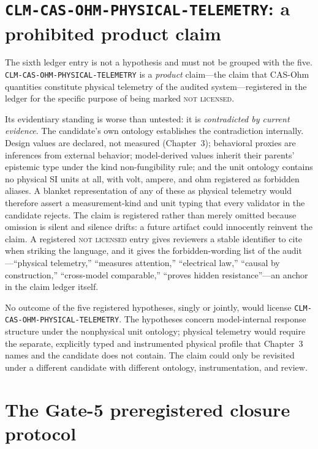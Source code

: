 \section{\texttt{CLM-CAS-OHM-PHYSICAL-TELEMETRY}: a prohibited product claim}\label{hyp:sec:telemetry}

The sixth ledger entry is not a hypothesis and must not be grouped with the five. \texttt{CLM-CAS-OHM-PHYSICAL-TELEMETRY} is a \emph{product} claim---the claim that CAS-Ohm quantities constitute physical telemetry of the audited system---registered in the ledger for the specific purpose of being marked \textsc{not licensed}.

Its evidentiary standing is worse than untested: it is \emph{contradicted by current evidence}. The candidate's own ontology establishes the contradiction internally. Design values are declared, not measured (Chapter~3); behavioral proxies are inferences from external behavior; model-derived values inherit their parents' epistemic type under the kind non-fungibility rule; and the unit ontology contains no physical SI units at all, with volt, ampere, and ohm registered as forbidden aliases. A blanket representation of any of these as physical telemetry would therefore assert a measurement-kind and unit typing that every validator in the candidate rejects. The claim is registered rather than merely omitted because omission is silent and silence drifts: a future artifact could innocently reinvent the claim. A registered \textsc{not licensed} entry gives reviewers a stable identifier to cite when striking the language, and it gives the forbidden-wording list of the audit---``physical telemetry,'' ``measures attention,'' ``electrical law,'' ``causal by construction,'' ``cross-model comparable,'' ``proves hidden resistance''---an anchor in the claim ledger itself.

\begin{boundary}\label{hyp:bound:telemetry}
No outcome of the five registered hypotheses, singly or jointly, would license \texttt{CLM-CAS-OHM-PHYSICAL-TELEMETRY}. The hypotheses concern model-internal response structure under the nonphysical unit ontology; physical telemetry would require the separate, explicitly typed and instrumented physical profile that Chapter~3 names and the candidate does not contain. The claim could only be revisited under a different candidate with different ontology, instrumentation, and review.
\end{boundary}

\section{The Gate-5 preregistered closure protocol}\label{hyp:sec:protocol}

